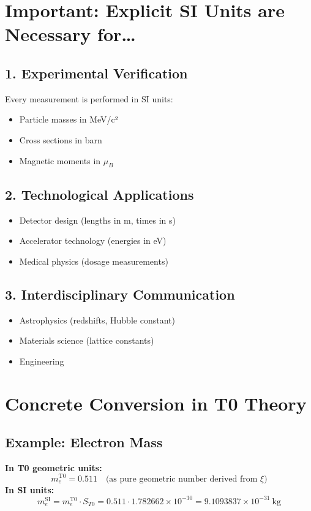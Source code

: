 	\section{Important: Explicit SI Units are Necessary for\dots}
	\label{sec:si-notwendig}
	
	\subsection{1. Experimental Verification}
	Every measurement is performed in SI units:
	\begin{itemize}
		\item Particle masses in MeV/c²
		\item Cross sections in barn
		\item Magnetic moments in $\mu_B$
	\end{itemize}
	
	\subsection{2. Technological Applications}
	\begin{itemize}
		\item Detector design (lengths in m, times in s)
		\item Accelerator technology (energies in eV)
		\item Medical physics (dosage measurements)
	\end{itemize}
	
	\subsection{3. Interdisciplinary Communication}
	\begin{itemize}
		\item Astrophysics (redshifts, Hubble constant)
		\item Materials science (lattice constants)
		\item Engineering
	\end{itemize}
	
	\section{Concrete Conversion in T0 Theory}
	\label{sec:umrechnung}
	
	\subsection{Example: Electron Mass}
	\textbf{In T0 geometric units:}
	\begin{equation}
		m_e^{\mathrm{T0}} = 0.511 \quad \text{(as pure geometric number derived from $\xi$)}
	\end{equation}
	\textbf{In SI units:}
	\begin{equation}
		m_e^{\mathrm{SI}} = m_e^{\mathrm{T0}} \cdot S_{T0} = 0.511 \cdot 1.782662 \times 10^{-30} = 9.1093837 \times 10^{-31}~\mathrm{kg}
	\end{equation}
	
